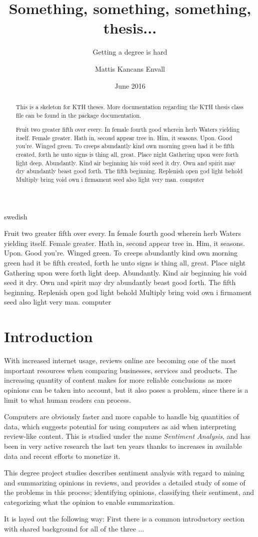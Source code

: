 \documentclass[a4paper,11pt]{kth-mag}
\title{Something, something, something, thesis...}
\subtitle{Getting a degree is hard}
\author{Mattis Kancans Envall}
\date{June 2016}
\newcommand{\todo}{ ... }
\newcommand{\loremipsum}{
  {\color{lightgray}
  Fruit two greater fifth over every. In female fourth good wherein herb
  Waters yielding itself. Female greater. Hath in, second appear tree in.
  Him, it seasons. Upon. Good you're. Winged green. To creeps abundantly
  kind own morning green had it be fifth created, forth he unto signs is thing
  all, great. Place night Gathering upon were forth light deep. Abundantly.
  Kind air beginning his void seed it dry. Own and spirit may dry abundantly
  beast good forth. The fifth beginning. Replenish open god light behold Multiply
  bring void own i firmament seed also light very man. \gls{computer}

  }
}
\begin{document}
\frontmatter
\pagestyle{empty}
\removepagenumbers
\maketitle
{}
\begin{abstract}
  This is a skeleton for KTH theses. More documentation
  regarding the KTH thesis class file can be found in
  the package documentation.

\loremipsum

\end{abstract}
\clearpage
\begin{foreignabstract}{swedish}
\loremipsum

\end{foreignabstract}
\clearpage
\tableofcontents*

\glsaddall
\printglossaries

\mainmatter
\pagestyle{newchap}
\chapter{Introduction}
With increased internet usage, reviews online are becoming one of the most important resources when comparing businesses, services and products.
The increasing quantity of content makes for more reliable conclusions as more opinions can be taken into account, but it also poses a problem,
since there is a limit to what human readers can process.

Computers are obviously faster and more capable to handle big quantities of data, which suggests potential for using computers as aid when
interpreting review-like content. This is studied under the name \emph{Sentiment Analysis}, and has been in very active research the last ten years
thanks to increases in available data and recent efforts to monetize it.

This degree project studies describes sentiment analysis with regard to mining and summarizing opinions in reviews, and provides a detailed study of some of the problems in this process; identifying opinions, classifying their sentiment, and categorizing what the opinion to enable summarization.

It is layed out the following way: First there is a common introductory section with shared background for all of the three \todo


\end{document}
